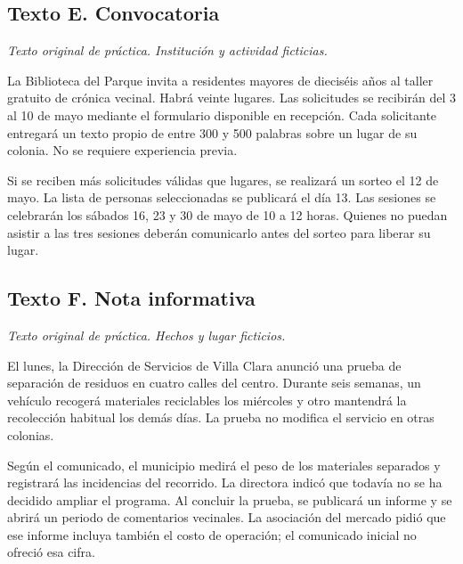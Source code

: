 \subsection*{Texto E. Convocatoria}
\textit{Texto original de práctica. Institución y actividad ficticias.}

La Biblioteca del Parque invita a residentes mayores de dieciséis años al taller gratuito de crónica vecinal. Habrá veinte lugares. Las solicitudes se recibirán del 3 al 10 de mayo mediante el formulario disponible en recepción. Cada solicitante entregará un texto propio de entre 300 y 500 palabras sobre un lugar de su colonia. No se requiere experiencia previa.

Si se reciben más solicitudes válidas que lugares, se realizará un sorteo el 12 de mayo. La lista de personas seleccionadas se publicará el día 13. Las sesiones se celebrarán los sábados 16, 23 y 30 de mayo de 10 a 12 horas. Quienes no puedan asistir a las tres sesiones deberán comunicarlo antes del sorteo para liberar su lugar.

\subsection*{Texto F. Nota informativa}
\textit{Texto original de práctica. Hechos y lugar ficticios.}

El lunes, la Dirección de Servicios de Villa Clara anunció una prueba de separación de residuos en cuatro calles del centro. Durante seis semanas, un vehículo recogerá materiales reciclables los miércoles y otro mantendrá la recolección habitual los demás días. La prueba no modifica el servicio en otras colonias.

Según el comunicado, el municipio medirá el peso de los materiales separados y registrará las incidencias del recorrido. La directora indicó que todavía no se ha decidido ampliar el programa. Al concluir la prueba, se publicará un informe y se abrirá un periodo de comentarios vecinales. La asociación del mercado pidió que ese informe incluya también el costo de operación; el comunicado inicial no ofreció esa cifra.
